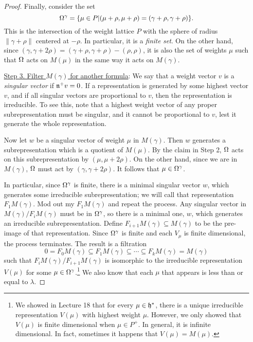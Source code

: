 \begin{proof}
  Finally, consider the set
  \[
    \Omega^\gamma = \{\mu\in P| (\mu+\rho,\mu+\rho) = (\gamma+\rho,\gamma+\rho)\}.
  \]
  This is the intersection of the weight lattice $P$ with the sphere of radius
  $\|\gamma+\rho\|$ centered at $-\rho$. In particular, it is a \emph{finite set}. On
  the other hand, since $(\gamma,\gamma+2\rho) =
  (\gamma+\rho,\gamma+\rho)-(\rho,\rho)$, it is also the set of weights $\mu$ such
  that $\Omega$ acts on $M(\mu)$ in the same way it acts on $M(\gamma)$.

  \underline{Step 3. Filter $M(\gamma)$ for another formula}: We say that a weight
  vector $v$ is a \emph{singular vector} if $\mathfrak{n}^+v=0$. If a representation is
  generated by some highest vector $v$, and if all singular vectors are proportional to
  $v$, then the representation is irreducible. To see this, note that a highest weight
  vector of any proper subrepresentation must be singular, and it cannot be
  proportional to $v$, lest it generate the whole representation.

  Now let $w$ be a singular vector of weight $\mu$ in $M(\gamma)$. Then $w$ generates
  a subrepresentation which is a quotient of $M(\mu)$. By the claim in Step 2, $\Omega$
  acts on this subrepresentation by $(\mu,\mu+2\rho)$. On the other hand, since we are
  in $M(\gamma)$, $\Omega$ must act by $(\gamma,\gamma+2\rho)$. It follows that $\mu\in
  \Omega^\gamma$.

  In particular, since $\Omega^\gamma$ is finite, there is a minimal singular vector $w$,
  which generates some irreducible subrepresentation; we will call that representation
  $F_1M(\gamma)$. Mod out my $F_1M(\gamma)$ and repeat the process. Any singular
  vector in $M(\gamma)/F_iM(\gamma)$ must be in $\Omega^\gamma$, so there is a minimal
  one, $w$, which generates an irreducible subrepresentation. Define
  $F_{i+1}M(\gamma)\subseteq M(\gamma)$ to be the pre-image of that representation.
  Since $\Omega^\gamma$ is finite and each $V_\mu$ is finite dimensional, the process
  terminates. The result is a filtration
  \[
    0=F_0M(\gamma) \subseteq F_1M(\gamma)\subseteq \cdots \subseteq
    F_kM(\gamma)=M(\gamma)
  \]
  such that $F_iM(\gamma)/F_{i+1}M(\gamma)$ is isomorphic to the irreducible
  representation $V(\mu)$ for some $\mu\in \Omega^\gamma$.\footnote{We showed in Lecture
  18 that for every $\mu\in \mathfrak{h}^*$, there is a unique irreducible representation
  $V(\mu)$ with highest weight $\mu$. However, we only showed that $V(\mu)$ is finite
  dimensional when $\mu\in P^+$. In general, it is infinite dimensional. In fact,
  sometimes it happens that $V(\mu)=M(\mu)$.} We also know that each
  $\mu$ that appears is less than or equal to $\lambda$.


\end{proof}
